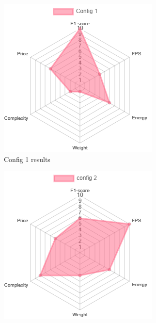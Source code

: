 \begin{figure}[h]
    \centering
    \begin{subfigure}{0.45\textwidth}
        \centering
        \includegraphics[width=\linewidth]{evenbilder/spiderdiag/config1.png}
        \caption{Config 1 results}
        \label{fig:a}
    \end{subfigure}
    \hfill
    \begin{subfigure}{0.45\textwidth}
        \centering
        \includegraphics[width=\linewidth]{evenbilder/spiderdiag/config2.png}

\end{subfigure}
\end{figure}
